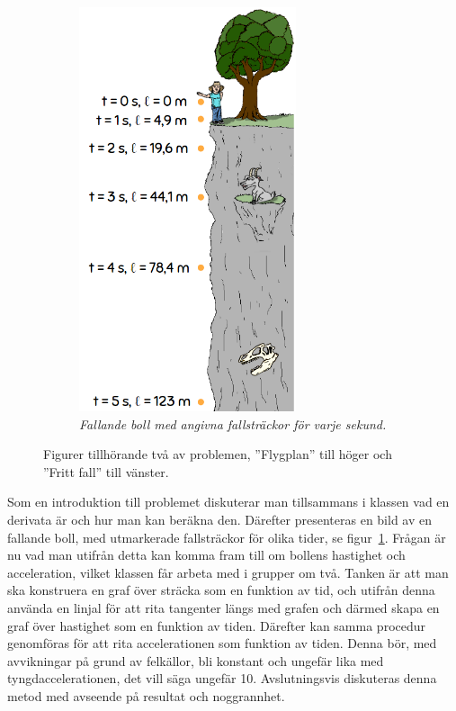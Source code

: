 \begin{figure}
\begin{subfigure}[b]{0.45\textwidth}
        \includegraphics[width=0.7\textwidth]{Figures/FrittFall.PNG}
        \caption{\textsl{Fallande boll med angivna fallsträckor för varje sekund.}}
        \label{fig:FrittFall}
    \end{subfigure}
    \hspace{0.4cm}
    \caption{Figurer tillhörande två av problemen, ''Flygplan'' till höger och ''Fritt fall'' till vänster.}
    \label{fig:three graphs}
\end{figure}
    
    \textcolor{lila}{Som en introduktion till problemet diskuterar man tillsammans i klassen vad en derivata är och hur man kan beräkna den. Därefter presenteras en bild av en fallande boll, med utmarkerade fallsträckor för olika tider, se figur~\ref{fig:FrittFall}. Frågan är nu vad man utifrån detta kan komma fram till om bollens hastighet och acceleration, vilket klassen får arbeta med i grupper om två. Tanken är att man ska konstruera en graf över sträcka som en funktion av tid, och utifrån denna använda en linjal för att rita tangenter längs med grafen och därmed skapa en graf över hastighet som en funktion av tiden. Därefter kan samma procedur genomföras för att rita accelerationen som funktion av tiden. Denna bör, med avvikningar på grund av felkällor, bli konstant och ungefär lika med tyngdaccelerationen, det vill säga ungefär 10. Avslutningsvis diskuteras denna metod med avseende på resultat och noggrannhet.}
    
